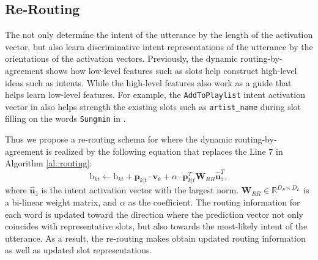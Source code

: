 \subsection{Re-Routing}
The {\ThirdCapsule} not only determine the intent of the utterance by the length of the activation vector, but also learn discriminative intent representations of the utterance by the orientations of the activation vectors.
Previously, the dynamic routing-by-agreement shows how low-level features such as slots help construct high-level ideas such as intents. While the high-level features also work as a guide that helps learn low-level features. For example, the \texttt{AddToPlaylist} intent activation vector in {\ThirdCapsule} also helps strength the existing slots such as \texttt{artist\_name} during slot filling on the words \texttt{Sungmin} in {\SecondCapsule}.

Thus we propose a re-routing schema for {\SecondCapsule} where the dynamic routing-by-agreement is realized by the following equation that replaces the Line 7 in Algorithm \ref{al::routing}:
\begin{equation}
\text{b}_{kt} \leftarrow \text{b}_{kt} + \mathbf{p}_{k|t}\cdot\mathbf{v}_{k} + \alpha \cdot \mathbf{p}_{k|t}^{T}{\mathbf{W}_{RR}}\mathbf{\hat u}_{\hat z}^{T},
\end{equation}
where $\mathbf{\hat u}_{\hat z}$ is the intent activation vector with the largest norm.
$\mathbf{W}_{RR}\in\mathbb{R}^{D_P \times D_L}$ is a bi-linear weight matrix, and $\alpha$ as the coefficient.
The routing information for each word is updated toward the direction where the prediction vector not only coincides with representative slots, but also towards the most-likely intent of the utterance.
As a result, the re-routing makes {\SecondCapsule} obtain updated routing information as well as updated slot representations.